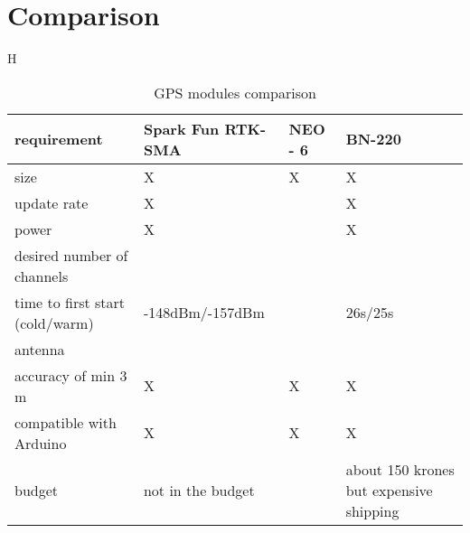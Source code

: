 \documentclass{article}[10pt]
\begin{document}
\section{Comparison}
\begin{table}{H}
\begin{center} 
        \begin{tabularx}{0.8\textwidth}{
            | >{\centering\arraybackslash}X  
            | >{\centering\arraybackslash}X
            | >{\centering\arraybackslash}X
            | >{\centering\arraybackslash}X | }
    \hline
    requirement&Spark Fun RTK-SMA&NEO - 6&BN-220 \\
    \hline
    size&X&X&X\\
    \hline
    update rate&X&&X\\
    \hline
    power&X&&X\\
    \hline
    desired number of channels&&&72\\
    \hline
    time to first start (cold/warm)&-148dBm/-157dBm&&26s/25s\\
    \hline
    antenna&&&\\
    \hline
    accuracy of min 3 m&X&X&X\\
    \hline
    compatible with Arduino&X&X&X\\
    \hline
    budget&not in the budget&&about 150 krones but expensive shipping\\
    \hline
\end{tabularx}
\caption{GPS modules comparison}
\label{tab:Table}
\end{center}
\end{table}
\end{document}
